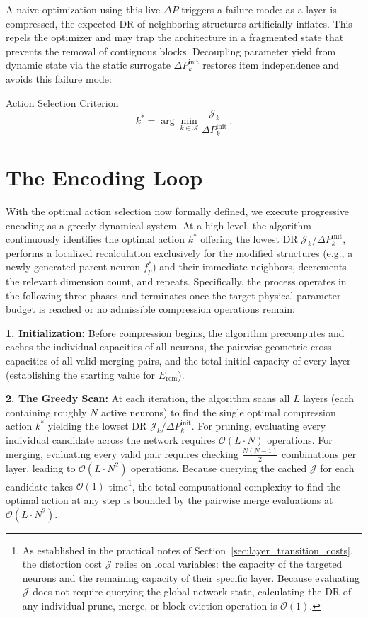 \documentclass[11pt, a4paper, copyright, gdm]{google}
\newcommand{\calA}{\mathcal{A}}
\newcommand{\calJ}{\mathcal{J}}
\newcommand{\calO}{\mathcal{O}}
\theoremstyle{definition}
\begin{document}
A naive optimization using this live $\Delta P$ triggers a failure mode: as a layer is compressed, the expected DR of neighboring structures artificially inflates. This repels the optimizer and may trap the architecture in a fragmented state that prevents the removal of contiguous blocks. Decoupling parameter yield from dynamic state via the static surrogate $\Delta P_k^{\text{init}}$ restores item independence and avoids this failure mode:
\begin{insight}{Action Selection Criterion}
\begin{equation}
k^* = \arg\min_{k \in \calA} \frac{\calJ_k}{\Delta P_k^{\text{init}}}\,.
\end{equation}
\end{insight}

\section{The Encoding Loop}
\label{sec:progressive_encoder}
With the optimal action selection now formally defined, we execute progressive encoding as a greedy dynamical system. At a high level, the algorithm continuously identifies the optimal action $k^*$ offering the lowest DR $\calJ_k/\Delta P_k^{\text{init}}$, performs a localized recalculation exclusively for the modified structures (e.g., a newly generated parent neuron $f_p^*$) and their immediate neighbors, decrements the relevant dimension count, and repeats. Specifically, the process operates in the following three phases and terminates once the target physical parameter budget is reached or no admissible compression operations remain:


\textbf{1. Initialization:} Before compression begins, the algorithm precomputes and caches the individual capacities of all neurons, the pairwise geometric cross-capacities of all valid merging pairs, and the total initial capacity of every layer (establishing the starting value for $E_{\text{rem}}$).

\textbf{2. The Greedy Scan:} At each iteration, the algorithm scans all $L$ layers (each containing roughly $N$ active neurons) to find the single optimal compression action $k^*$ yielding the lowest DR $\calJ_k/\Delta P_k^{\text{init}}$. For pruning, evaluating every individual candidate across the network requires $\calO(L \cdot N)$ operations. For merging, evaluating every valid pair requires checking $\frac{N(N-1)}{2}$ combinations per layer, leading to $\calO(L \cdot N^2)$ operations. Because querying the cached $\calJ$ for each candidate takes $\calO(1)$ time\footnote{As established in the practical notes of Section~\ref{sec:layer_transition_costs}, the distortion cost $\calJ$ relies on local variables: the capacity of the targeted neurons and the remaining capacity of their specific layer. Because evaluating $\calJ$ does not require querying the global network state, calculating the DR of any individual prune, merge, or block eviction operation is $\calO(1)$.}, the total computational complexity to find the optimal action at any step is bounded by the pairwise merge evaluations at $\calO(L \cdot N^2)$.
\end{document}
